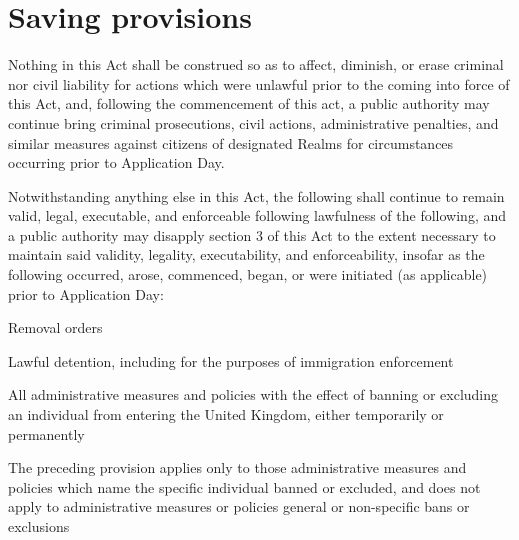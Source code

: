 \documentclass[private]{ukbill}
\begin{document}
\section{Saving provisions}
\begin{numstat}
\item Nothing in this Act shall  be construed so as to affect, diminish, or erase criminal nor civil liability for actions which were unlawful prior to the coming into force of this Act, and, following the commencement of this act, a public authority may continue bring criminal prosecutions, civil actions, administrative penalties, and similar measures against citizens of designated Realms for circumstances occurring prior to Application Day.
\item Notwithstanding anything else in this Act, the following shall continue to remain valid, legal, executable, and enforceable following  lawfulness of the following, and a public authority may disapply section 3 of this Act to the extent necessary to maintain said validity, legality, executability, and enforceability,  insofar as the following occurred, arose, commenced, began, or were initiated (as applicable) prior to Application Day:
\begin{alphstat}
	\item Removal orders
	\item Lawful detention, including for the purposes of immigration enforcement
	\item All administrative measures and policies with the effect of banning or excluding an individual from entering the United Kingdom, either temporarily or permanently
	\begin{romstat}
	\item The preceding provision applies only to those  administrative measures and policies which name the specific individual banned or excluded, and does not apply to administrative measures or policies general 	or non-specific bans or exclusions \end{romstat}
	\end{alphstat}
\end{numstat}
\end{document}
